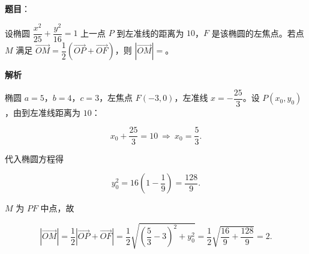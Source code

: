\begin{answer}

\textbf{题目}：

设椭圆 $\dfrac{x^2}{25}+\dfrac{y^2}{16}=1$ 上一点 $P$ 到左准线的距离为 $10$，$F$ 是该椭圆的左焦点。若点 $M$ 满足 $\overrightarrow{OM}=\dfrac12\left(\overrightarrow{OP}+\overrightarrow{OF}\right)$，则 $|\overrightarrow{OM}|=$\gkblank{}。

\textbf{解析}

椭圆 $a=5$，$b=4$，$c=3$，左焦点 $F(-3,0)$，左准线 $x=-\dfrac{25}3$。设 $P(x_0,y_0)$，由到左准线距离为 $10$：

\nopagebreak[4]
\[x_0+\frac{25}3=10\ \Rightarrow\ x_0=\frac53.\]

代入椭圆方程得

\nopagebreak[4]
\[y_0^2=16\left(1-\frac{1}{9}\right)=\frac{128}9.\]

$M$ 为 $PF$ 中点，故

\nopagebreak[4]
\[|\overrightarrow{OM}|=\frac12\left|\overrightarrow{OP}+\overrightarrow{OF}\right|=\frac12\sqrt{\left(\frac53-3\right)^2+y_0^2}=\frac12\sqrt{\frac{16}9+\frac{128}9}=2.\]


\end{answer}
